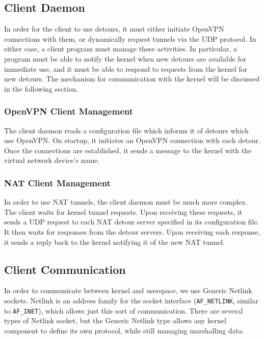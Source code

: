 \subsection{Client Daemon}

In order for the client to use detours, it must either initiate OpenVPN
connections with them, or dynamically request tunnels via the UDP protocol. In
either case, a client program must manage these activities. In particular, a
program must be able to notify the kernel when new detours are available for
immediate use, and it must be able to respond to requests from the kernel for
new detours. The mechanism for communication with the kernel will be discussed
in the following section.

\subsubsection{OpenVPN Client Management}

The client daemon reads a configuration file which informs it of detours which
use OpenVPN. On startup, it initiates an OpenVPN connection with each detour.
Once the connections are established, it sends a message to the kernel with the
virtual network device's name.

\subsubsection{NAT Client Management}

In order to use NAT tunnels, the client daemon must be much more complex. The
client waits for kernel tunnel requests. Upon receiving these requests, it sends
a UDP request to each NAT detour server specified in its configuration file. It
then waits for responses from the detour servers. Upon receiving each response,
it sends a reply back to the kernel notifying it of the new NAT tunnel.

\subsection{Client Communication}

In order to communicate between kernel and userspace, we use Generic Netlink
sockets. Netlink is an address family for the socket interface
(\texttt{AF\_NETLINK}, similar to \texttt{AF\_INET}), which allows just this
sort of communication. There are several types of Netlink socket, but the
Generic Netlink type allows any kernel component to define its own protocol,
while still managing marshalling data.


